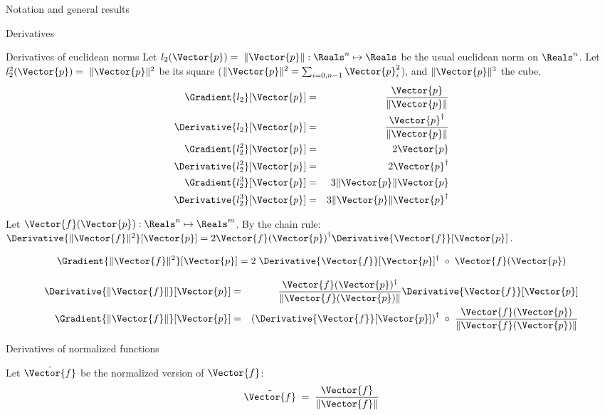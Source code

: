 \begin{plSection}{Notation and general results}
\begin{plSection}{Derivatives}
\begin{plSection}{Derivatives of euclidean norms}
Let $l_2(\Vector{p}) = \; \| \Vector{p}  \|
: \Reals^n \mapsto \Reals$ 
be the usual euclidean norm on $\Reals^n$.
Let $l_2^2(\Vector{p}) = \; \| \Vector{p}  \|^2 $
be its square
($ \| \Vector{p}  \|^2  = \sum_{i=0,n-1} \Vector{p}_i^2$),
and $ \| \Vector{p}  \|^3$ the cube.
\begin{eqnarray}
\label{eq:l2-gradient}
\Gradient{l_2}[\Vector{p}] 
& = & \frac{\Vector{p}}{\|\Vector{p}\|} \\
\Derivative{l_2}[\Vector{p}]
 & = & \frac{ \Vector{p}^\dagger }{ \|\Vector{p}\|} \nonumber \\
\Gradient{l_2^2}[\Vector{p}] & = & 2\Vector{p} \nonumber \\ 
\Derivative{l_2^2}[\Vector{p}] & = & 2\Vector{p}^\dagger \nonumber \\
\Gradient{l_2^3}[\Vector{p}] 
& = & 3 \| \Vector{p}  \| \Vector{p} \nonumber \\
\Derivative{l_2^3}[\Vector{p}] 
& = & 3 \| \Vector{p}  \| \Vector{p}^\dagger \nonumber
\end{eqnarray}

Let $\Vector{f}(\Vector{p}) : \Reals^n \mapsto \Reals^m$.
By the chain rule:
$\Derivative{\| \Vector{f} \|^2}[\Vector{p}]
=  
2 {\Vector{f}(\Vector{p})}^{\dagger}
 \Derivative{\Vector{f}}[\Vector{p}] $.

\begin{equation}
\Gradient{\| \Vector{f} \|^2}[\Vector{p}]  = 
 2 \;\Derivative{\Vector{f}}[\Vector{p}]^\dagger 
 \;\circ \;\Vector{f}(\Vector{p})
\end{equation}

\begin{eqnarray}
\label{eq:norm_derivative}
\Derivative{\| \Vector{f} \|}[\Vector{p}]
& = &
\frac{\Vector{f}(\Vector{p})^\dagger} 
{\| \Vector{f}(\Vector{p}) \|} 
\Derivative{\Vector{f}}[\Vector{p}]  \\
\Gradient{\| \Vector{f} \|}[\Vector{p}]
& = &
\left(\Derivative{\Vector{f}}[\Vector{p}]\right)^\dagger
\;\circ \;
\frac{\Vector{f}(\Vector{p})} 
{\|\Vector{f}(\Vector{p})\|}
\label{eq:norm_gradient}
\end{eqnarray}

\end{plSection}%
\begin{plSection}{Derivatives of normalized functions}
\label{sec:Derivatives-of-normalized-functions}

Let $\tilde{\Vector{f}}$ be the normalized version of 
$\Vector{f}$:
\begin{equation}
\tilde{\Vector{f}} \;= \;
\frac{\Vector{f}}{\|\Vector{f}\|}
\end{equation}


\end{plSection}
\end{plSection}
\end{plSection}
